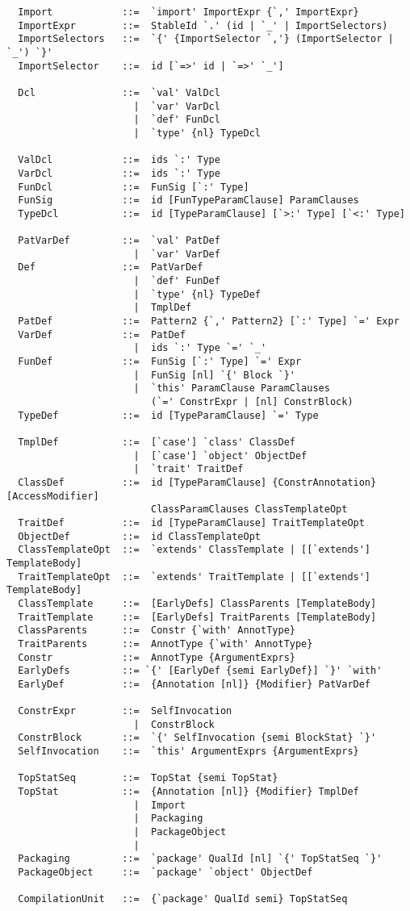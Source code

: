 {\begin{lstlisting}
  Import            ::=  `import' ImportExpr {`,' ImportExpr}
  ImportExpr        ::=  StableId `.' (id | `_' | ImportSelectors)
  ImportSelectors   ::=  `{' {ImportSelector `,'} (ImportSelector | `_') `}'
  ImportSelector    ::=  id [`=>' id | `=>' `_']

  Dcl               ::=  `val' ValDcl
                      |  `var' VarDcl
                      |  `def' FunDcl
                      |  `type' {nl} TypeDcl

  ValDcl            ::=  ids `:' Type
  VarDcl            ::=  ids `:' Type
  FunDcl            ::=  FunSig [`:' Type]
  FunSig            ::=  id [FunTypeParamClause] ParamClauses
  TypeDcl           ::=  id [TypeParamClause] [`>:' Type] [`<:' Type]

  PatVarDef         ::=  `val' PatDef
                      |  `var' VarDef
  Def               ::=  PatVarDef
                      |  `def' FunDef
                      |  `type' {nl} TypeDef
                      |  TmplDef
  PatDef            ::=  Pattern2 {`,' Pattern2} [`:' Type] `=' Expr
  VarDef            ::=  PatDef
                      |  ids `:' Type `=' `_'
  FunDef            ::=  FunSig [`:' Type] `=' Expr
                      |  FunSig [nl] `{' Block `}'
                      |  `this' ParamClause ParamClauses 
                         (`=' ConstrExpr | [nl] ConstrBlock)
  TypeDef           ::=  id [TypeParamClause] `=' Type

  TmplDef           ::=  [`case'] `class' ClassDef
                      |  [`case'] `object' ObjectDef
                      |  `trait' TraitDef
  ClassDef          ::=  id [TypeParamClause] {ConstrAnnotation} [AccessModifier] 
                         ClassParamClauses ClassTemplateOpt 
  TraitDef          ::=  id [TypeParamClause] TraitTemplateOpt
  ObjectDef         ::=  id ClassTemplateOpt
  ClassTemplateOpt  ::=  `extends' ClassTemplate | [[`extends'] TemplateBody]
  TraitTemplateOpt  ::=  `extends' TraitTemplate | [[`extends'] TemplateBody]
  ClassTemplate     ::=  [EarlyDefs] ClassParents [TemplateBody]
  TraitTemplate     ::=  [EarlyDefs] TraitParents [TemplateBody]
  ClassParents      ::=  Constr {`with' AnnotType}
  TraitParents      ::=  AnnotType {`with' AnnotType}
  Constr            ::=  AnnotType {ArgumentExprs}
  EarlyDefs         ::= `{' [EarlyDef {semi EarlyDef}] `}' `with'
  EarlyDef          ::=  {Annotation [nl]} {Modifier} PatVarDef

  ConstrExpr        ::=  SelfInvocation 
                      |  ConstrBlock
  ConstrBlock       ::=  `{' SelfInvocation {semi BlockStat} `}'
  SelfInvocation    ::=  `this' ArgumentExprs {ArgumentExprs}

  TopStatSeq        ::=  TopStat {semi TopStat}
  TopStat           ::=  {Annotation [nl]} {Modifier} TmplDef
                      |  Import
                      |  Packaging
                      |  PackageObject
                      |  
  Packaging         ::=  `package' QualId [nl] `{' TopStatSeq `}'
  PackageObject     ::=  `package' `object' ObjectDef

  CompilationUnit   ::=  {`package' QualId semi} TopStatSeq
\end{lstlisting}
}

